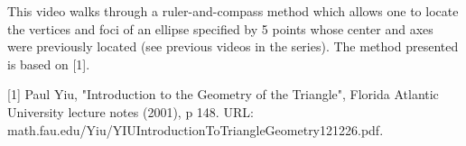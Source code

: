 This video walks through a ruler-and-compass method which allows one to locate the vertices and foci of an ellipse specified by 5 points whose center and axes were previously located (see previous videos in the series). The method presented is based on [1].

[1] Paul Yiu, "Introduction to the Geometry of the Triangle", Florida Atlantic University lecture notes (2001), p 148. URL: math.fau.edu/Yiu/YIUIntroductionToTriangleGeometry121226.pdf.